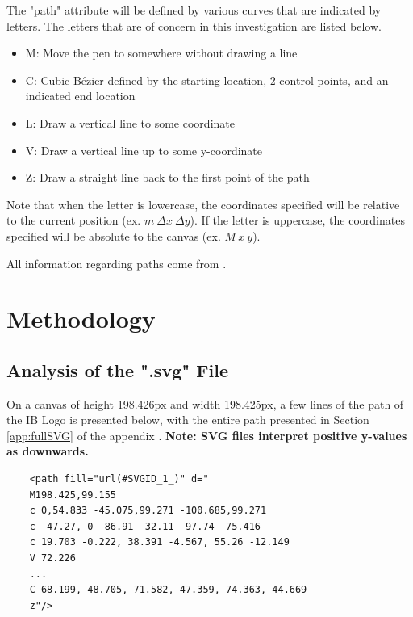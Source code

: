 \documentclass[letterpaper, 12pt]{article}
\begin{document}
The "path" attribute will be defined by various curves that are indicated
by letters. The letters that are of concern in this investigation are
listed below.
\begin{itemize}
    \item M: Move the pen to somewhere without drawing a line
    \item C: Cubic Bézier defined by the starting location, 2 control points, and an indicated end location
    \item L: Draw a vertical line to some coordinate
    \item V: Draw a vertical line up to some y-coordinate
    \item Z: Draw a straight line back to the first point of the path
\end{itemize}

Note that when the letter is lowercase, the coordinates specified will
be relative to the current position (ex. \(m~\Delta x~\Delta y\)). If the letter is uppercase, the
coordinates specified will be absolute to the canvas (ex. \(M~x~y\)).

All information regarding paths come from \cite{mozilladevelopernetworkPathsSVGScalable2023}.




\section{Methodology}

\subsection{Analysis of the ".svg" File} \label{svgAnalysis}

On a canvas of height 198.426px and width 198.425px,
a few lines of the path of the IB Logo is presented below,
with the entire path presented in Section \ref*{app:fullSVG}
of the appendix
\cite{internationalbaccalaureateorganisationInternationalBaccalaureateLogo2013}. \textbf{Note: SVG files interpret positive y-values as downwards.}

\begin{verbatim}
    <path fill="url(#SVGID_1_)" d="
    M198.425,99.155
    c 0,54.833 -45.075,99.271 -100.685,99.271
    c -47.27, 0 -86.91 -32.11 -97.74 -75.416
    c 19.703 -0.222, 38.391 -4.567, 55.26 -12.149
    V 72.226
    ...
    C 68.199, 48.705, 71.582, 47.359, 74.363, 44.669
    z"/>
\end{verbatim}
\end{document}
